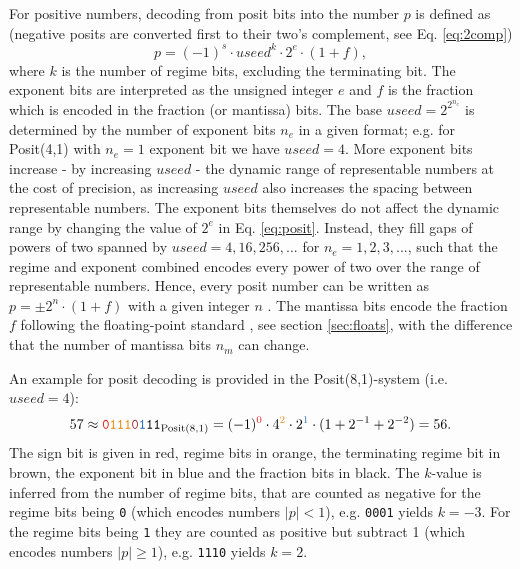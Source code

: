 For positive numbers, decoding from posit bits into the number $p$ is defined as
\citep{Gustafson2017a,Klower2019a,Chen2018} (negative posits are converted first to their two's complement, see
Eq. \ref{eq:2comp})
\begin{equation}
p = (-1)^s \cdot useed^k \cdot 2^e \cdot (1+f),
\label{eq:posit}
\end{equation}
where $k$ is the number of regime bits, excluding the terminating bit. The exponent bits are interpreted as the unsigned integer $e$
and $f$ is the fraction which is encoded in the fraction (or mantissa) bits. The base $useed = 2^{2^{n_e}}$ is
determined by the number of exponent bits $n_e$ in a given format; e.g. for Posit(4,1) with $n_e=1$ exponent bit we have $useed = 4$.
More exponent bits increase - by increasing $useed$ - the dynamic range of representable numbers at the cost of precision,
as increasing $useed$ also increases the spacing between representable numbers. The exponent bits themselves do
not affect the dynamic range by changing the value of $2^e$ in Eq. \ref{eq:posit}. Instead, they fill gaps of
powers of two spanned by $useed = 4,16,256,...$ for $n_e=1,2,3,...$, such that the regime and exponent combined
encodes every power of two over the range of representable numbers. Hence, every posit number can be written as
$p = \pm 2^n \cdot (1+f)$ with a given integer $n$ \citep{Gustafson2017a,Chen2018}. The mantissa bits encode the
fraction $f$ following the floating-point standard \citep{IEEE1985}, see section \ref{sec:floats}, with the difference that
the number of mantissa bits $n_m$ can change.

An example for posit decoding is provided in the Posit(8,1)-system (i.e. $useed = 4$):
\begin{equation}
57 \approx \mathtt{{\color{psign}0}{\color{pregime}111}{\color{pregimet}0}{\color{pexpo}1}11}_{\op{Posit}(8,1)} = (-1)^{\color{psign}0}
\cdot 4^{\color{pregime}2} \cdot 2^{\color{pexpo}1} \cdot (1+2^{-1}+2^{-2}) = 56.
\label{eq:posit_pos}
\end{equation}
The sign bit is given in red, regime bits in orange, the terminating regime bit in brown, the exponent bit in blue and the fraction bits in black.
The $k$-value is inferred from the number of regime bits, that are counted as negative for the regime bits being \texttt{0}
(which encodes numbers $\vert p \vert <1$), e.g. \texttt{{\color{pregime}000}{\color{pregimet}1}} yields $k=-3$. For the regime bits being \texttt{1}
they are counted as positive but subtract 1 (which encodes numbers $\vert p \vert \geq 1$), e.g. \texttt{{\color{pregime}111}{\color{pregimet}0}}
yields $k=2$.

